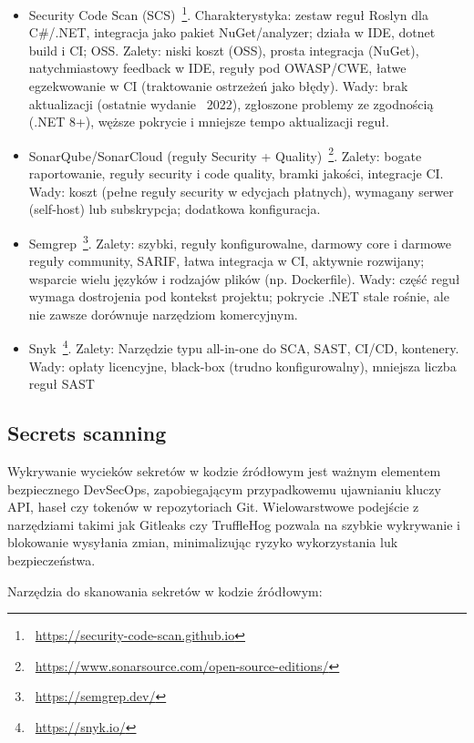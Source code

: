 \begin{itemize}
\item  Security Code Scan (SCS)~\footnote{~\url{https://security-code-scan.github.io}}. Charakterystyka: zestaw reguł Roslyn dla C\#/.NET, integracja jako pakiet NuGet/analyzer; działa w IDE, dotnet build i CI; OSS. Zalety: niski koszt (OSS), prosta integracja (NuGet), natychmiastowy feedback w IDE, reguły pod OWASP/CWE, łatwe egzekwowanie w CI (traktowanie ostrzeżeń jako błędy). Wady: brak aktualizacji (ostatnie wydanie ~2022), zgłoszone problemy ze zgodnością (.NET 8+), węższe pokrycie i mniejsze tempo aktualizacji reguł.
\item SonarQube/SonarCloud (reguły Security + Quality)~\footnote{~\url{https://www.sonarsource.com/open-source-editions/}}. Zalety: bogate raportowanie, reguły security i code quality, bramki jakości, integracje CI. Wady: koszt (pełne reguły security w edycjach płatnych), wymagany serwer (self-host) lub subskrypcja; dodatkowa konfiguracja.
\item Semgrep~\footnote{~\url{https://semgrep.dev/}}. Zalety: szybki, reguły konfigurowalne, darmowy core i darmowe reguły community, SARIF, łatwa integracja w CI, aktywnie rozwijany; wsparcie wielu języków i rodzajów plików (np. Dockerfile). Wady: część reguł wymaga dostrojenia pod kontekst projektu; pokrycie .NET stale rośnie, ale nie zawsze dorównuje narzędziom komercyjnym. 
\item Snyk~\footnote{~\url{https://snyk.io/}}. Zalety: Narzędzie typu all-in-one do SCA, SAST, CI/CD, kontenery. Wady: opłaty licencyjne, black-box (trudno konfigurowalny), mniejsza liczba reguł SAST
\end{itemize}

\subsection{Secrets scanning}

Wykrywanie wycieków sekretów w kodzie źródłowym jest ważnym elementem bezpiecznego DevSecOps, zapobiegającym przypadkowemu ujawnianiu kluczy API, haseł czy tokenów w repozytoriach Git. Wielowarstwowe podejście z narzędziami takimi jak Gitleaks czy TruffleHog pozwala na szybkie wykrywanie i blokowanie wysyłania zmian, minimalizując ryzyko wykorzystania luk bezpieczeństwa.

Narzędzia do skanowania sekretów w kodzie źródłowym:

